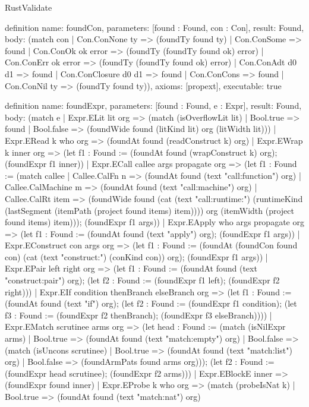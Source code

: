\begin{lexlean}{RustValidate}
\begin{semanticmodule}
definition{
  name: foundCon,
  parameters: [found : Found, con : Con],
  result: Found,
  body: (match con
    | Con.ConNone ty => (foundTy found ty)
    | Con.ConSome => found
    | Con.ConOk ok error => (foundTy (foundTy found ok) error)
    | Con.ConErr ok error => (foundTy (foundTy found ok) error)
    | Con.ConAdt d0 d1 => found
    | Con.ConClosure d0 d1 => found
    | Con.ConCons => found
    | Con.ConNil ty => (foundTy found ty)),
  axioms: [propext],
  executable: true
}

definition{
  name: foundExpr,
  parameters: [found : Found, e : Expr],
  result: Found,
  body: (match e
    | Expr.ELit lit org => (match (isOverflowLit lit)
      | Bool.true => found
      | Bool.false => (foundWide found (litKind lit) org (litWidth lit)))
    | Expr.ERead k who org => (foundAt found (readConstruct k) org)
    | Expr.EWrap k inner org => (let f1 : Found := (foundAt found (wrapConstruct k) org); (foundExpr f1 inner))
    | Expr.ECall callee args propagate org => (let f1 : Found := (match callee
      | Callee.CalFn n => (foundAt found (text "call:function") org)
      | Callee.CalMachine m => (foundAt found (text "call:machine") org)
      | Callee.CalRt item => (foundWide found (cat (text "call:runtime:") (runtimeKind (lastSegment (itemPath (project found items) item)))) org (itemWidth (project found items) item))); (foundExpr f1 args))
    | Expr.EApply who args propagate org => (let f1 : Found := (foundAt found (text "apply") org); (foundExpr f1 args))
    | Expr.EConstruct con args org => (let f1 : Found := (foundAt (foundCon found con) (cat (text "construct:") (conKind con)) org); (foundExpr f1 args))
    | Expr.EPair left right org => (let f1 : Found := (foundAt found (text "construct:pair") org); (let f2 : Found := (foundExpr f1 left); (foundExpr f2 right)))
    | Expr.EIf condition thenBranch elseBranch org => (let f1 : Found := (foundAt found (text "if") org); (let f2 : Found := (foundExpr f1 condition); (let f3 : Found := (foundExpr f2 thenBranch); (foundExpr f3 elseBranch))))
    | Expr.EMatch scrutinee arms org => (let head : Found := (match (isNilExpr arms)
      | Bool.true => (foundAt found (text "match:empty") org)
      | Bool.false => (match (isUncons scrutinee)
        | Bool.true => (foundAt found (text "match:list") org)
        | Bool.false => (foundArmPats found arms org))); (let f2 : Found := (foundExpr head scrutinee); (foundExpr f2 arms)))
    | Expr.EBlockE inner => (foundExpr found inner)
    | Expr.EProbe k who org => (match (probeIsNat k)
      | Bool.true => (foundAt found (text "match:nat") org)
}
\end{semanticmodule}
\end{lexlean}
